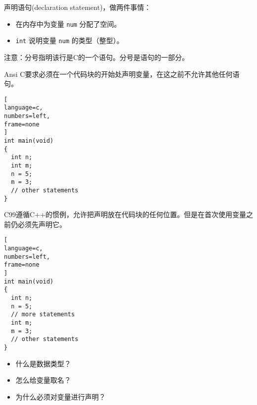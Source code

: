 \begin{frame}[fragile]


 
声明语句(declaration statement)，做两件事情：\vspace{0.1in}
\begin{itemize}
\item 
在内存中为变量 \lstinline|num| 分配了空间。\\[0.1in]
\item 
 \lstinline|int| 说明变量 \lstinline|num| 的类型（整型）。
\end{itemize} \vspace{0.1in}

\pause 

注意：分号指明该行是C的一个语句。分号是语句的一部分。
 
\end{frame}

\begin{frame}[fragile]
Ansi C要求必须在一个代码块的开始处声明变量，在这之前不允许其他任何语句。

\begin{lstlisting}[
language=c,
numbers=left,
frame=none
]
int main(void)
{
  int n;
  int m;
  n = 5;
  m = 3;
  // other statements
}
\end{lstlisting}
\end{frame}

\begin{frame}[fragile]
C99遵循C++的惯例，允许把声明放在代码块的任何位置。但是在首次使用变量之前仍必须先声明它。

\begin{lstlisting}[
language=c,
numbers=left,
frame=none
]
int main(void)
{
  int n;
  n = 5;
  // more statements
  int m;
  m = 3;
  // other statements
}
\end{lstlisting}
\end{frame}


\begin{frame}[fragile]
\begin{wenti}
\begin{itemize}
\item 什么是数据类型？\\[.1in]
\item 怎么给变量取名？ \\[.1in]
\item 为什么必须对变量进行声明？
\end{itemize}
\end{wenti}
\end{frame}

